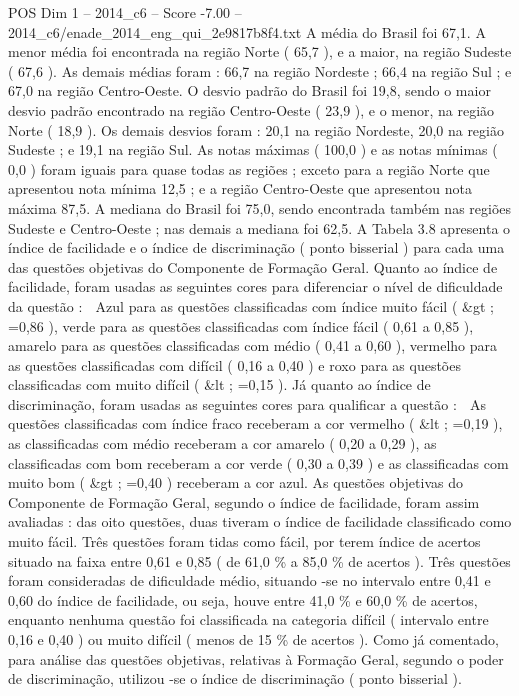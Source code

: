 \begin{textsample}{POS Dim 1 – 2014\_c6 – Score -7.00 – 2014\_c6/enade\_2014\_eng\_qui\_2e9817b8f4.txt}
A média do Brasil foi 67,1.
A menor média foi encontrada na região Norte ( 65,7 ), e a maior, na região Sudeste ( 67,6 ).
As demais médias foram : 66,7 na região Nordeste ; 66,4 na região Sul ; e 67,0 na região Centro-Oeste.
O desvio padrão do Brasil foi 19,8, sendo o maior desvio padrão encontrado na região Centro-Oeste ( 23,9 ), e o menor, na região Norte ( 18,9 ).
Os demais desvios foram : 20,1 na região Nordeste, 20,0 na região Sudeste ; e 19,1 na região Sul.
As notas máximas ( 100,0 ) e as notas mínimas ( 0,0 ) foram iguais para quase todas as regiões ; exceto para a região Norte que apresentou nota mínima 12,5 ; e a região Centro-Oeste que apresentou nota máxima 87,5.
A mediana do Brasil foi 75,0, sendo encontrada também nas regiões Sudeste e Centro-Oeste ; nas demais a mediana foi 62,5.
A Tabela 3.8 apresenta o índice de facilidade e o índice de discriminação ( ponto bisserial ) para cada uma das questões objetivas do Componente de Formação Geral.
Quanto ao índice de facilidade, foram usadas as seguintes cores para diferenciar o nível de dificuldade da questão :  Azul para as questões classificadas com índice muito fácil ( \&gt ; =0,86 ), verde para as questões classificadas com índice fácil ( 0,61 a 0,85 ), amarelo para as questões classificadas com médio ( 0,41 a 0,60 ), vermelho para as questões classificadas com difícil ( 0,16 a 0,40 ) e roxo para as questões classificadas com muito difícil ( \&lt ; =0,15 ).
Já quanto ao índice de discriminação, foram usadas as seguintes cores para qualificar a questão :  As questões classificadas com índice fraco receberam a cor vermelho ( \&lt ; =0,19 ), as classificadas com médio receberam a cor amarelo ( 0,20 a 0,29 ), as classificadas com bom receberam a cor verde ( 0,30 a 0,39 ) e as classificadas com muito bom ( \&gt ; =0,40 ) receberam a cor azul.
As questões objetivas do Componente de Formação Geral, segundo o índice de facilidade, foram assim avaliadas : das oito questões, duas tiveram o índice de facilidade classificado como muito fácil.
Três questões foram tidas como fácil, por terem índice de acertos situado na faixa entre 0,61 e 0,85 ( de 61,0 \% a 85,0 \% de acertos ).
Três questões foram consideradas de dificuldade médio, situando -se no intervalo entre 0,41 e 0,60 do índice de facilidade, ou seja, houve entre 41,0 \% e 60,0 \% de acertos, enquanto nenhuma questão foi classificada na categoria difícil ( intervalo entre 0,16 e 0,40 ) ou muito difícil ( menos de 15 \% de acertos ).
Como já comentado, para análise das questões objetivas, relativas à Formação Geral, segundo o poder de discriminação, utilizou -se o índice de discriminação ( ponto bisserial ).

\end{textsample}
